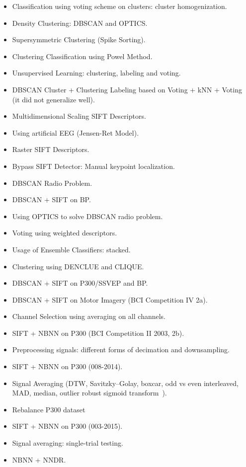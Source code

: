 \begin{itemize}
\item Classification using voting scheme on clusters:  cluster homogenization.
\item Density Clustering: DBSCAN and OPTICS.
\item Supersymmetric Clustering (Spike Sorting).
\item Clustering Classification using Powel Method.
\item Unsupervised Learning: clustering, labeling and voting.
\item DBSCAN Cluster + Clustering Labeling based on Voting + kNN + Voting (it did not generalize well).
\item Multidimensional Scaling SIFT Descriptors.
\item Using artificial EEG (Jensen-Ret Model).
\item Raster SIFT Descriptors.
\item Bypass SIFT Detector: Manual keypoint localization.
\item DBSCAN Radio Problem.
\item DBSCAN + SIFT on BP.
\item Using OPTICS to solve DBSCAN radio problem.
\item Voting using weighted descriptors.
\item Usage of Ensemble Classifiers: stacked.
\item Clustering using DENCLUE and CLIQUE.
\item DBSCAN + SIFT on P300/SSVEP and BP.
\item DBSCAN + SIFT on Motor Imagery (BCI Competition IV 2a).
\item Channel Selection using averaging on all channels.
\item SIFT + NBNN on P300 (BCI Competition II 2003, 2b).
\item Preprocessing signals: different forms of decimation and downsampling.
\item SIFT + NBNN on P300 (008-2014).
\item Signal Averaging (DTW, Savitzky–Golay, boxcar, odd vs even interleaved, MAD, median, outlier robust sigmoid transform~\cite{Fulcher2014}).
\item Rebalance P300 dataset~\cite{Tibon2015}
\item SIFT + NBNN on P300 (003-2015).
\item Signal averaging: single-trial testing.
\item NBNN + NNDR.

\end{itemize}
